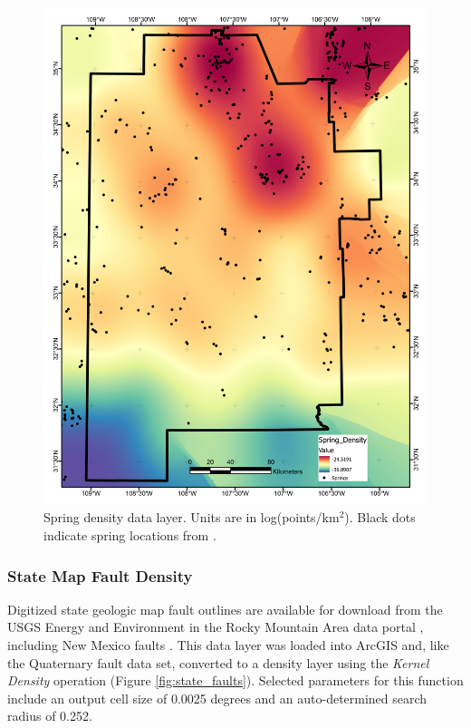 \begin{figure}[!htp]
\centering
\includegraphics[scale=.50]{templates/images/Figure-SpringDensity.pdf}
\caption[Spring density data layer]{Spring density data layer. Units are in log(points/km$^2$). Black dots indicate spring locations from \protect\citep{usgs_national_2021}.}
\label{fig:feat_spring}
\end{figure}

\subsubsection{State Map Fault Density}

Digitized state geologic map fault outlines are available for download from the USGS Energy and Environment in the Rocky Mountain Area data portal \citep{usgs_eerma_2021}, including New Mexico faults \citep{stoeser_new_2005}. This data layer was loaded into ArcGIS and, like the Quaternary fault data set, converted to a density layer using the \textit{Kernel Density} operation (Figure \ref{fig:state_faults}). Selected parameters for this function include an output cell size of 0.0025 degrees and an auto-determined search radius of 0.252.

